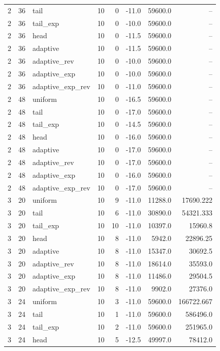 \begin{tabular}{rrlrrrrr}
2 & 36 & tail & 10 & 0 & -11.0 & 59600.0 & -- \\
2 & 36 & tail\_exp & 10 & 0 & -10.0 & 59600.0 & -- \\
2 & 36 & head & 10 & 0 & -11.5 & 59600.0 & -- \\
2 & 36 & adaptive & 10 & 0 & -11.5 & 59600.0 & -- \\
2 & 36 & adaptive\_rev & 10 & 0 & -10.0 & 59600.0 & -- \\
2 & 36 & adaptive\_exp & 10 & 0 & -10.0 & 59600.0 & -- \\
2 & 36 & adaptive\_exp\_rev & 10 & 0 & -11.0 & 59600.0 & -- \\
2 & 48 & uniform & 10 & 0 & -16.5 & 59600.0 & -- \\
2 & 48 & tail & 10 & 0 & -17.0 & 59600.0 & -- \\
2 & 48 & tail\_exp & 10 & 0 & -14.5 & 59600.0 & -- \\
2 & 48 & head & 10 & 0 & -16.0 & 59600.0 & -- \\
2 & 48 & adaptive & 10 & 0 & -17.0 & 59600.0 & -- \\
2 & 48 & adaptive\_rev & 10 & 0 & -17.0 & 59600.0 & -- \\
2 & 48 & adaptive\_exp & 10 & 0 & -16.0 & 59600.0 & -- \\
2 & 48 & adaptive\_exp\_rev & 10 & 0 & -17.0 & 59600.0 & -- \\
3 & 20 & uniform & 10 & 9 & -11.0 & 11288.0 & 17690.222 \\
3 & 20 & tail & 10 & 6 & -11.0 & 30890.0 & 54321.333 \\
3 & 20 & tail\_exp & 10 & 10 & -11.0 & 10397.0 & 15960.8 \\
3 & 20 & head & 10 & 8 & -11.0 & 5942.0 & 22896.25 \\
3 & 20 & adaptive & 10 & 8 & -11.0 & 15347.0 & 30692.5 \\
3 & 20 & adaptive\_rev & 10 & 8 & -11.0 & 18614.0 & 35593.0 \\
3 & 20 & adaptive\_exp & 10 & 8 & -11.0 & 11486.0 & 29504.5 \\
3 & 20 & adaptive\_exp\_rev & 10 & 8 & -11.0 & 9902.0 & 27376.0 \\
3 & 24 & uniform & 10 & 3 & -11.0 & 59600.0 & 166722.667 \\
3 & 24 & tail & 10 & 1 & -11.0 & 59600.0 & 586496.0 \\
3 & 24 & tail\_exp & 10 & 2 & -11.0 & 59600.0 & 251965.0 \\
3 & 24 & head & 10 & 5 & -12.5 & 49997.0 & 78412.0 \\

\end{tabular}
